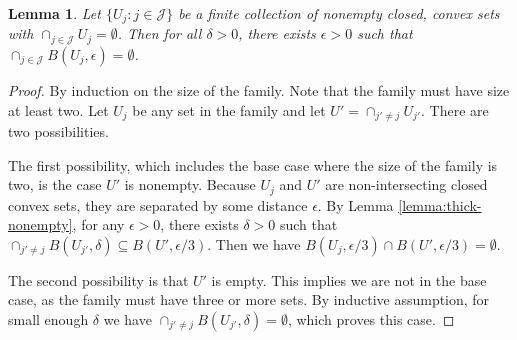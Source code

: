 \documentclass{article}
\newtheorem{lemma}{Lemma}
\theoremstyle{definition}
\begin{document}
\begin{lemma} \label{lemma:thick-empty}
  Let $\{U_j : j \in \mathcal{J}\}$ be a finite collection of nonempty closed, convex sets with $\cap_{j\in\mathcal{J}} U_j = \emptyset$.
  Then for all $\delta > 0$, there exists  $\epsilon > 0$ such that $\cap_{j\in\mathcal{J}} B(U_j,\epsilon) = \emptyset$.
\end{lemma}
\begin{proof}
  By induction on the size of the family.
  Note that the family must have size at least two.
  Let $U_j$ be any set in the family and let $U' = \cap_{j' \neq j} U_{j'}$.
  There are two possibilities.

  The first possibility, which includes the base case where the size of the family is two, is the case $U'$ is nonempty.
  Because $U_j$ and $U'$ are non-intersecting closed convex sets, they are separated by some distance $\epsilon$.
  By Lemma \ref{lemma:thick-nonempty}, for any $\epsilon > 0$, there exists $\delta > 0$ such that $\cap_{j'\neq j} B(U_{j'},\delta) \subseteq B(U', \epsilon/3)$.
  Then we have $B(U_j, \epsilon/3) \cap B(U', \epsilon/3) = \emptyset$.

  The second possibility is that $U'$ is empty.
  This implies we are not in the base case, as the family must have three or more sets.
  By inductive assumption, for small enough $\delta$ we have $\cap_{j' \neq j} B(U_{j'},\delta) = \emptyset$, which proves this case.
\end{proof}
\end{document}
